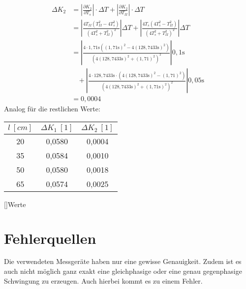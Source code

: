       \begin{align*}
    	\Delta K_2 &= \left|\frac{\partial K_2}{\partial T_{s}}\right| \cdot \Delta T + \left| \frac{\partial K_2}{\partial T_{II}}\right| \cdot \Delta T \\ 
        & = \left| \frac{4T_{II} (T_{II}^2 - 4 T_s^2)}{(4T_s^2 + T_{II}^2)^2} \right| \Delta T + \left| \frac{4T_{s} (4T_{s}^2 - T_{II}^2)}{(4T_s^2 + T_{II}^2)^2} \right| \Delta T \\ 
        &= \left| \frac{4 \cdot 1,71\si{\second} ((1,71\si{\second})^2 - 4 (128,7433\si{\second})^2)}{(4 (128,7433\si{\second})^2 + (1,71)^2)^2} \right| 0,1\si{\second}  \\ & ~~~~+ \left| \frac{4 \cdot 128,7433\si{\second} \cdot (4(128,7433\si{\second})^2 - (1,71)^2)}{(4(128,7433\si{\second})^2 + (1,71\si{\second})^2)^2} \right| 0,05\si{\second} \\
        &= 0,0004
     \end{align*}
    Analog für die restlichen Werte:
    \begin{center}
    
    \begin{tabular}{c||c|c}
    $l ~ [cm]$ & $\Delta K_1~[1] $ & $\Delta K_2~[1]$ \\ \hline \hline
    20&0,0580	&0,0004 \\
	35&0,0584	&0,0010\\
	50&0,0580	&0,0018\\
	65&0,0574	&0,0025\\

    \end{tabular}
    []{Werte}
   \end{center}
    
\section{Fehlerquellen}
    Die verwendeten Messgeräte haben nur eine gewisse Genauigkeit. Zudem ist es auch nicht möglich ganz exakt eine gleichphasige oder eine genau gegenphasige Schwingung zu erzeugen. Auch hierbei kommt es zu einem Fehler.
\pagebreak